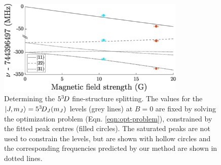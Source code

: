 





\begin{figure}
\centering
	\includegraphics[width=0.8\textwidth]{fig/spectroscopy/fitting-lines}
	\caption{Determining the $5^{3\!} D$ fine-structure splitting.
	The values for the $|J,m_J\rangle=5^{3\!} D_J(m_J)$ levels (grey lines) at $B=0$ are fixed by solving the optimization problem (Eqn.
	\ref{eqn:opt-problem}), constrained by the fitted peak centres (filled circles).
	The saturated peaks are not used to constrain the levels, but are shown with hollow circles and the corresponding frequencies predicted by our method are shown in dotted lines.}
    \label{fig:fitting_3D}
\end{figure}




